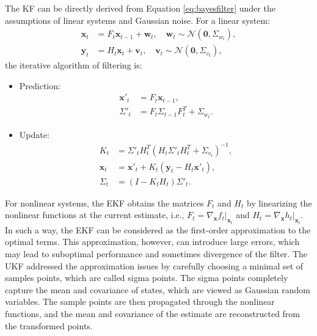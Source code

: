 The \ac{KF} \citep{kf1960} can be directly derived from Equation \ref{eq:bayesfilter} under the assumptions of linear systems and Gaussian noise. For a linear system:
\begin{subequations}
    \begin{align}
        \boldsymbol{x}_t &= F_t\boldsymbol{x}_{t-1} + \boldsymbol{w}_t, \quad \boldsymbol{w}_t\sim\mathcal{N}(\boldsymbol{0}, \Sigma_{w_t}),\\
        \boldsymbol{y}_t &= H_t\boldsymbol{x}_t + \boldsymbol{v}_t, \quad \boldsymbol{v}_t\sim\mathcal{N}(\boldsymbol{0}, \Sigma_{v_t}),
    \end{align}
\end{subequations}
the iterative algorithm of filtering is:
\begin{itemize}
    \item Prediction:
    \begin{subequations}\label{eq:kalman_prediction}
    \begin{align}
        \boldsymbol{x}'_t &= F_t\boldsymbol{x}_{t-1}, \label{eq:kalman_prediction_a} \\
        \Sigma'_{t} &= F_t\Sigma_{t-1}F_t^T+\Sigma_{w_t}. \label{eq:kalman_prediction_b}
    \end{align}
    \end{subequations}
    \item Update:
    \begin{subequations}\label{eq:kalman_update}
    \begin{align}
        K_t &= \Sigma'_{t}H_t^T(H_t\Sigma'_{t}H_t^T+\Sigma_{v_t})^{-1} \label{eq:kalman_update_a}, \\
        \boldsymbol{x}_t &= \boldsymbol{x}'_t+K_t(\boldsymbol{y}_t-H_t\boldsymbol{x}'_t) \label{eq:kalman_update_b}, \\
        \Sigma_t &= (I-K_tH_t)\Sigma'_{t} \label{eq:kalman_update_c}.
    \end{align}
    \end{subequations}
\end{itemize}

For nonlinear systems, the \acf{EKF} \citep{simon2006optimal} obtains the matrices $F_t$ and $H_t$ by linearizing the nonlinear functions at the current estimate, i.e., $F_t=\nabla_{\boldsymbol{x}} f_t|_{\boldsymbol{x}_t}$ and $H_t=\nabla_{\boldsymbol{x}} h_t|_{\boldsymbol{x}_t}$. In such a way, the \ac{EKF} can be considered as the first-order approximation to the optimal terms. This approximation, however, can introduce large errors, which may lead to suboptimal performance and sometimes divergence of the filter. The \acf{UKF} \citep{ukf2000} addressed the approximation issues by carefully choosing a minimal set of samples points, which are called sigma points. The sigma points completely capture the mean and covariance of states, which are viewed as Gaussian random variables. The sample points are then propagated through the nonlinear functions, and the mean and covariance of the estimate are reconstructed from the transformed points. 

